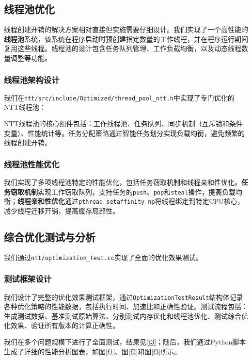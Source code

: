 \documentclass[a4paper]{article}
\begin{document}
\subsection{线程池优化}

线程创建开销的解决方案相对直接但实施需要仔细设计。我们实现了一个高性能的\textbf{线程池}系统，该系统在程序启动时预创建指定数量的工作线程，并在程序运行期间复用这些线程。线程池的设计包含任务队列管理、工作负载均衡，以及动态线程数量调整等功能。

\subsubsection{线程池架构设计}

我们在\texttt{ntt/src/include/Optimized/thread\_pool\_ntt.h}中实现了专门优化的NTT线程池：

NTT线程池的核心组件包括：工作线程池、任务队列、同步机制（互斥锁和条件变量）、性能统计等。任务分配策略通过智能任务划分实现负载均衡，避免频繁的线程创建开销。

\subsubsection{线程池性能优化}

我们实现了多项线程池特定的性能优化，包括任务窃取机制和线程亲和性优化。\textbf{任务窃取机制}实现工作窃取队列，支持任务的\texttt{push}、\texttt{pop}和\texttt{steal}操作，提高负载均衡；\textbf{线程亲和性优化}通过\texttt{pthread\_setaffinity\_np}将线程绑定到特定CPU核心，减少线程迁移开销，提高缓存局部性。

\subsection{综合优化测试与分析}

我们通过\texttt{ntt/optimization\_test.cc}实现了全面的优化效果测试。

\subsubsection{测试框架设计}

我们设计了完整的优化效果测试框架，通过\texttt{OptimizationTestResult}结构体记录各种优化策略的性能数据，包括执行时间、加速比和正确性验证。测试流程包括：生成测试数据、基准测试原始算法、分别测试内存优化和线程池优化、测试综合优化效果、验证所有版本的计算正确性。

我们在多个问题规模下进行了全面测试，结果见\ref{t3}；随后，我们通过Python脚本生成了详细的性能分析图表，如图\ref{f1}、图\ref{f2}和图\ref{f3}所示。
\end{document}
